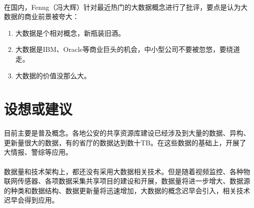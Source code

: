 \documentclass[12pt]{article}
\begin{document}
\paragraph{}
在国内，Fenng（冯大辉）针对最近热门的大数据概念进行了批评，要点是认为大数据的商业前景被夸大：
\begin{enumerate}
\item
大数据是个相对概念，新瓶装旧酒。
\item
大数据是IBM、Oracle等商业巨头的机会，中小型公司不要被忽悠，要绕道走。
\item
大数据的价值没那么大。

\end{enumerate}

\newpage
\section{设想或建议}

\paragraph{}
目前主要是普及概念。各地公安的共享资源库建设已经涉及到大量的数据、异构、更新量很大的数据，有的省厅的数据达到数十TB。在这些数据的基础上，开展了大情报、警综等应用。
\paragraph{}数据量和技术架构上，都还没有采用大数据相关技术。但是随着视频监控、各种物联网传感器、各项数据采集共享项目的建设和开展，数据量将进一步增大、数据源的种类和数据结构、数据更新量将迅速增加，大数据的概念迟早会引入，相关技术迟早会得到应用。
\end{document}
